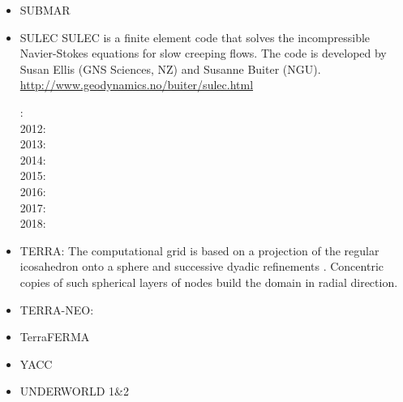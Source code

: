\begin{itemize}
\item SUBMAR

\cite{masr06}
\cite{masp07}
\cite{roms10}


\item SULEC
SULEC is a finite element code that solves the incompressible Navier-Stokes equations 
for slow creeping flows. The code is developed by Susan Ellis 
(GNS Sciences, NZ) and Susanne Buiter (NGU). 
\url{http://www.geodynamics.no/buiter/sulec.html}

: \cite{qube11}\cite{ellw11}\\
2012: \cite{buit12}\cite{tebu12}\cite{crsg12}\cite{grel12}\\
2013: \cite{ghbu13}\\
2014: \cite{ghbu14}\cite{qubu14}\\
2015: \cite{nabu15}\\
2016: \cite{zwsn16}\\
2017: \cite{nabp17}\\
2018: \cite{tebu18}











\item TERRA:
The computational grid is based on a projection of the regular icosahedron onto a 
sphere and successive dyadic refinements \cite{bafr85}.  Concentric copies of such  
spherical layers of nodes build the domain in radial direction.

\cite{baum83}
\cite{glat88}
\cite{buba95}
\cite{burb97}\cite{yang97}
\cite{burl98}
\cite{phbs09}\cite{wodd09}\cite{gows09}
\cite{woda11}
\cite{dagd12}
\cite{dadb13}
\cite{vade16}

\item TERRA-NEO:
\cite{wegg15}


\item TerraFERMA
\cite{wisv14}
\cite{wisv17}
\cite{spmw16}
\cite{ceww17}
\cite{ceww19}


\item YACC
\cite{tosn15}
\cite{tomy16}

\item UNDERWORLD 1\&2


\end{itemize}
